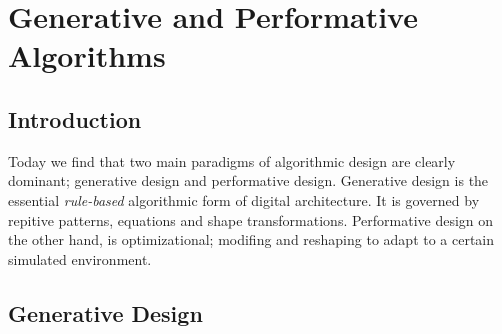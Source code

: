\chapter{Generative and Performative Algorithms}

\section{Introduction}

Today we find that two main paradigms of algorithmic design are clearly dominant; generative design
and performative design. Generative design is the essential \emph{rule-based} algorithmic form of
digital architecture. It is governed by repitive patterns, equations and shape transformations.
Performative design on the other hand, is optimizational; modifing and reshaping to adapt to a
certain simulated environment.

\section{Generative Design}
